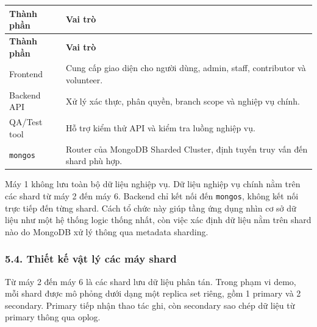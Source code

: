 \documentclass[12pt,a4paper]{article}
\begin{document}
\begin{center}
\small
\begin{longtable}{|p{3.2cm}|p{8.8cm}|}
\hline
\textbf{Thành phần} & \textbf{Vai trò} \\ \hline
\endfirsthead
\hline
\textbf{Thành phần} & \textbf{Vai trò} \\ \hline
\endhead
Frontend & Cung cấp giao diện cho người dùng, admin, staff, contributor và volunteer. \\ \hline
Backend API & Xử lý xác thực, phân quyền, branch scope và nghiệp vụ chính. \\ \hline
QA/Test tool & Hỗ trợ kiểm thử API và kiểm tra luồng nghiệp vụ. \\ \hline
\texttt{mongos} & Router của MongoDB Sharded Cluster, định tuyến truy vấn đến shard phù hợp. \\ \hline
\end{longtable}
\normalsize
\end{center}

Máy 1 không lưu toàn bộ dữ liệu nghiệp vụ. Dữ liệu nghiệp vụ chính nằm trên các shard từ máy 2 đến máy 6. Backend chỉ kết nối đến \texttt{mongos}, không kết nối trực tiếp đến từng shard. Cách tổ chức này giúp tầng ứng dụng nhìn cơ sở dữ liệu như một hệ thống logic thống nhất, còn việc xác định dữ liệu nằm trên shard nào do MongoDB xử lý thông qua metadata sharding.

\subsubsection*{5.4. Thiết kế vật lý các máy shard}

Từ máy 2 đến máy 6 là các shard lưu dữ liệu phân tán. Trong phạm vi demo, mỗi shard được mô phỏng dưới dạng một replica set riêng, gồm 1 primary và 2 secondary. Primary tiếp nhận thao tác ghi, còn secondary sao chép dữ liệu từ primary thông qua oplog.
\end{document}
